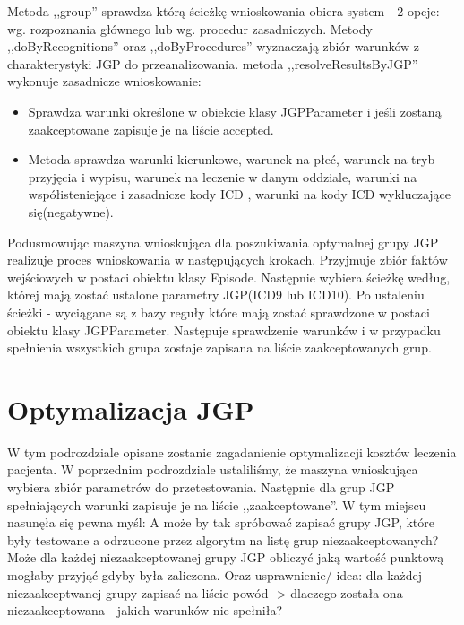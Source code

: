 Metoda ,,group'' sprawdza którą ścieżkę wnioskowania obiera system - 2 opcje: wg. rozpoznania głównego lub wg. procedur zasadniczych. Metody ,,doByRecognitions'' oraz ,,doByProcedures'' wyznaczają zbiór warunków z charakterystyki JGP do przeanalizowania. metoda ,,resolveResultsByJGP'' wykonuje zasadnicze wnioskowanie:
\begin{itemize}\itemsep1pt
 \item Sprawdza warunki określone w obiekcie klasy JGPParameter i jeśli zostaną zaakceptowane zapisuje je na liście accepted.
 \item Metoda sprawdza warunki kierunkowe, warunek na płeć, warunek na tryb przyjęcia i wypisu, warunek na leczenie w danym oddziale, warunki na współisteniejące i zasadnicze kody ICD , warunki na kody ICD wykluczające się(negatywne).
\end{itemize}

Podusmowując maszyna wnioskująca dla poszukiwania optymalnej grupy JGP realizuje proces wnioskowania w następujących krokach. Przyjmuje zbiór faktów wejściowych w postaci obiektu klasy Episode. Następnie wybiera ścieżkę według, której mają zostać ustalone parametry JGP(ICD9 lub ICD10). Po ustaleniu ścieżki - wyciągane są z bazy reguły które mają zostać sprawdzone w postaci obiektu klasy JGPParameter. Następuje sprawdzenie warunków i w przypadku spełnienia wszystkich grupa zostaje zapisana na liście zaakceptowanych grup.


\section{Optymalizacja JGP}
\label{sec:optymalizacjaJGP}

W tym podrozdziale opisane zostanie zagadanienie optymalizacji kosztów leczenia pacjenta. W poprzednim podrozdziale ustaliliśmy, że maszyna wnioskująca wybiera zbiór parametrów do przetestowania. Następnie dla grup JGP spełniających warunki zapisuje je na liście ,,zaakceptowane''. W tym miejscu nasunęła się pewna myśl: A może by tak spróbować zapisać grupy JGP, które były testowane a odrzucone przez algorytm na listę grup niezaakceptowanych? Może dla każdej niezaakceptowanej grupy JGP obliczyć jaką wartość punktową mogłaby przyjąć gdyby była zaliczona. Oraz usprawnienie/ idea: dla każdej niezaakceptwanej grupy zapisać na liście powód -> dlaczego została ona niezaakceptowana - jakich warunków nie spełniła?

